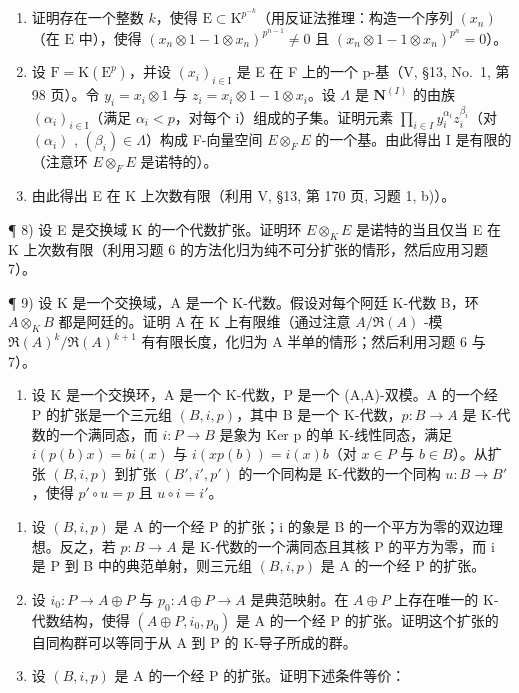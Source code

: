 \begin{enumerate}
\def\labelenumi{\alph{enumi})}
\item
  证明存在一个整数 \(k\)，使得 \(\mathrm{E} \subset \mathrm{K}^{p^{-k}}\)（用反证法推理：构造一个序列 \((x_{n})\)（在 \(\mathrm{E}\) 中），使得 \((x_{n} \otimes 1 - 1 \otimes x_{n})^{p^{n-1}} \neq 0\) 且 \((x_{n} \otimes 1 - 1 \otimes x_{n})^{p^n} = 0\)）。
\item
  设 \(\mathrm{F} = \mathrm{K}(\mathrm{E}^{p})\)，并设 \((x_{i})_{i \in \mathrm{I}}\) 是 E 在 F 上的一个 p-基（V, §13, No.~1, 第 98 页）。令 \(y_{i} = x_{i} \otimes 1\) 与 \(z_{i} = x_{i} \otimes 1 - 1 \otimes x_{i}\)。设 \(\Lambda\) 是 \(\mathbf{N}^{(I)}\) 的由族 \((\alpha_{i})_{i \in \mathrm{I}}\)（满足 \(\alpha_{i} < p\)，对每个 i）组成的子集。证明元素 \(\prod_{i \in I} y_{i}^{\alpha_{i}} z_{i}^{\beta_{i}}\)（对 \((\alpha_{i})\) , \((\beta_{i}) \in \Lambda\)）构成 F-向量空间 \(E \otimes_{F} E\) 的一个基。由此得出 I 是有限的（注意环 \(E \otimes_{F} E\) 是诺特的）。
\item
  由此得出 E 在 K 上次数有限（利用 V, §13, 第 170 页, 习题 1, b)）。
\end{enumerate}

¶ 8) 设 E 是交换域 K 的一个代数扩张。证明环 \(E \otimes_{K} E\) 是诺特的当且仅当 E 在 K 上次数有限（利用习题 6 的方法化归为纯不可分扩张的情形，然后应用习题 7）。

¶ 9) 设 K 是一个交换域，A 是一个 K-代数。假设对每个阿廷 K-代数 B，环 \(A \otimes_{K} B\) 都是阿廷的。证明 A 在 K 上有限维（通过注意 \(A/\Re(A)\) -模 \(\Re(A)^{k}/\Re(A)^{k+1}\) 有有限长度，化归为 A 半单的情形；然后利用习题 6 与 7）。

\begin{enumerate}
\def\labelenumi{\arabic{enumi})}
\setcounter{enumi}{9}
\tightlist
\item
  设 K 是一个交换环，A 是一个 K-代数，P 是一个 (A,A)-双模。A 的一个经 P 的扩张是一个三元组 \((B,i,p)\)，其中 B 是一个 K-代数，\(p:B\to A\) 是 K-代数的一个满同态，而 \(i:P\to B\) 是象为 Ker p 的单 K-线性同态，满足 \(i(p(b)x)=bi(x)\) 与 \(i(xp(b))=i(x)b\)（对 \(x\in P\) 与 \(b\in B\)）。从扩张 \((B,i,p)\) 到扩张 \((B',i',p')\) 的一个同构是 K-代数的一个同构 \(u:B\to B'\)，使得 \(p'\circ u=p\) 且 \(u\circ i=i'\)。
\end{enumerate}

\begin{enumerate}
\def\labelenumi{\alph{enumi})}
\item
  设 \((B, i, p)\) 是 A 的一个经 P 的扩张；i 的象是 B 的一个平方为零的双边理想。反之，若 \(p : B \to A\) 是 K-代数的一个满同态且其核 P 的平方为零，而 i 是 P 到 B 中的典范单射，则三元组 \((B, i, p)\) 是 A 的一个经 P 的扩张。
\item
  设 \(i_{0}: P \to A \oplus P\) 与 \(p_{0}: A \oplus P \to A\) 是典范映射。在 \(A \oplus P\) 上存在唯一的 K-代数结构，使得 \((A \oplus P, i_{0}, p_{0})\) 是 A 的一个经 P 的扩张。证明这个扩张的自同构群可以等同于从 A 到 P 的 K-导子所成的群。
\item
  设 \((B, i, p)\) 是 A 的一个经 P 的扩张。证明下述条件等价：
\end{enumerate}

